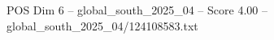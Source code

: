 \begin{textsample}{POS Dim 6 – global\_south\_2025\_04 – Score 4.00 – global\_south\_2025\_04/124108583.txt}
\end{textsample}
